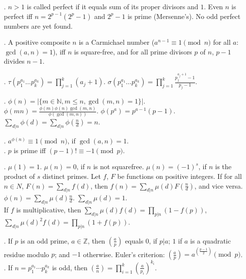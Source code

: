 .  $n>1$ is called perfect if it equals
sum of its proper divisors and $1$.  Even $n$ is perfect iff $n = 2^{p-1} (2^p - 1)$
and $2^p - 1$ is prime (Mersenne's). No odd perfect numbers are yet found.

.
A positive composite $n$ is a Carmichael number
($a^{n-1} \equiv 1 \pmod{n}$ for all $a$: $\gcd(a,n)=1$),
iff $n$ is square-free, and for all prime divisors $p$ of $n$, $p-1$ divides $n-1$.

.
$\tau(p_1^{a_1} \dots p_k^{a_k}) = \prod_{j=1}^k (a_j+1)$. \quad
$\sigma(p_1^{a_1} \dots p_k^{a_k}) = \prod_{j=1}^k \frac{p_j^{a_j+1}-1}{p_j-1}$.

.
$\phi(n)=|\{m \in {\mathbb N}, m \le n, \gcd(m, n) = 1 \}|$. \\
$\phi(mn) = \frac{\phi(m) \phi(n) \gcd(m,n)}{\phi(\gcd(m,n))}$. \quad
$\phi(p^a) = p^{a-1} (p-1)$. \quad
$\sum_{d|n} \phi(d) = \sum_{d|n} \phi(\frac{n}{d}) = n$.

. $a^{\phi(n)} \equiv 1\pmod{n}$, if $\gcd(a,n)=1$. \\
. $p$ is prime iff $(p - 1)! \equiv -1 \pmod p$.

.
$\mu(1) = 1$. $\mu(n) = 0$, if $n$ is not squarefree.
$\mu(n) = (-1)^s$, if $n$ is the product of $s$ distinct primes.
Let $f$, $F$ be functions on positive integers.
If for all $n \in N$, $F(n)=\sum_{d|n} f(d)$, then $f(n) = \sum_{d|n} \mu(d) F(\frac{n}{d})$,
and vice versa. \quad
$\phi(n) = \sum_{d|n} \mu(d) \frac{n}{d}$.
\quad $\sum_{d|n} \mu(d) = 1$. \\
If $f$ is multiplicative, then $\sum_{d|n} \mu(d) f(d) = \prod_{p|n}(1-f(p))$,
$\sum_{d|n} \mu(d)^2 f(d) = \prod_{p|n} (1+f(p))$.

. If $p$ is an odd prime, $a \in {\mathbb Z}$, then
$\left(\frac{a}{p}\right)$ equals $0$, if $p | a$; $1$ if $a$ is a quadratic
residue modulo $p$; and $-1$ otherwise.
Euler's criterion:
$\left(\frac{a}{p}\right)=a^{\left(\frac{p-1}{2}\right)} \pmod p$. \\
.  %
If $n=p_1^{a_1} \cdots p_k^{a_k}$ is odd, then
$\left(\frac{a}{n}\right) = \prod_{i=1}^k \left(\frac{a}{p_i}\right)^{k_i}$.

